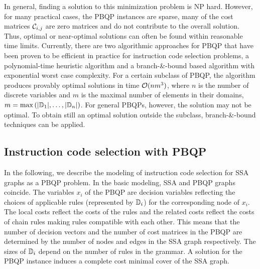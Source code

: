 In general, finding a solution to this minimization problem is NP
hard.  However, for many practical cases, the PBQP instances are
sparse, \ie many of the cost matrices ${\mathcal C}_{i,j}$ are zero
matrices and do not contribute to the overall solution. Thus, optimal
or near-optimal solutions can often be found within reasonable time
limits.  Currently, there are two algorithmic approaches for PBQP that
have been proven to be efficient in practice for instruction code selection
problems, \ie a polynomial-time heuristic algorithm and a
branch-\&-bound based algorithm with exponential worst case
complexity.  For a certain subclass of PBQP, the algorithm produces
provably optimal solutions in time ${\cal O}(n m^3)$, where $n$ is the
number of discrete variables and $m$ is the maximal number of elements
in their domains, \ie $m=\max
\left(|\mathbb D_1|,\ldots,|\mathbb D_n\right|)$. For general
{PBQP}s, however, the solution may not be optimal. To obtain still an
optimal solution outside the subclass, branch-\&-bound techniques can
be applied.

\subsection{Instruction code selection with PBQP}
In the following, we describe the modeling of instruction code selection for SSA
graphs as a PBQP problem.  In the basic modeling, SSA and PBQP graphs
coincide.  The variables $x_i$ of the PBQP are decision variables
reflecting the choices of applicable rules (represented by
$\mathbb D_i$) for the corresponding node of $x_i$. The local costs
reflect the costs of the rules and the related costs reflect the costs
of chain rules making rules compatible with each other.  This means
that the number of decision vectors and the number of cost matrices in
the PBQP are determined by the number of nodes and edges in the SSA
graph respectively.  The sizes of $\mathbb D_i$ depend on the number
of rules in the grammar. A solution for the PBQP instance induces a
complete cost minimal cover of the SSA graph.

